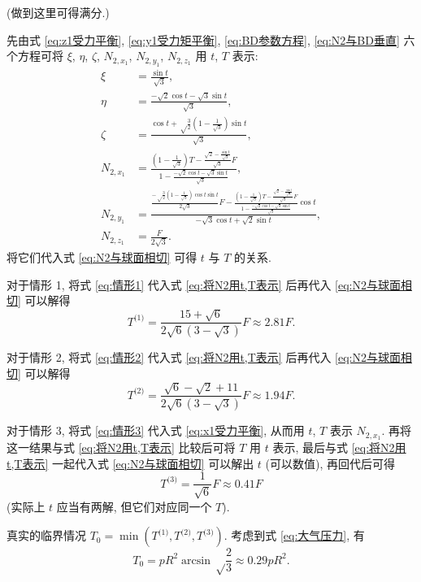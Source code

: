 \documentclass{article}
\begin{document}
(做到这里可得满分.)

先由式 \ref{eq:z1受力平衡}, \ref{eq:y1受力矩平衡}, \ref{eq:BD参数方程}, \ref{eq:N2与BD垂直}
六个方程可将 $\xi$, $\eta$, $\zeta$, $N_{2,x_1}$, $N_{2,y_1}$, $N_{2,z_1}$ 用 $t$, $T$ 表示:
\begin{equation}
\begin{split}
	\xi&=\frac{\sin t}{\sqrt3},\\
	\eta&=\frac{-\sqrt2\cos t-\sqrt3\sin t}{\sqrt3},\\
	\zeta&=\frac{\cos t+\sqrt\frac32\left(1-\frac1{\sqrt3}\right)\sin t}{\sqrt3},\\
	N_{2,x_1}&=\frac{\left(1-\frac1{\sqrt3}\right)T-\frac{\sqrt2-\frac{\sin t}{\sqrt3}}{\sqrt3}F}{1-\frac{-\sqrt2\cos t-\sqrt3\sin t}{\sqrt3}},\\
	N_{2,y_1}&=\frac{\frac{-\sqrt\frac32\left(1-\frac1{\sqrt3}\right)\cos t\sin t}{2\sqrt3}F-\frac{\left(1-\frac1{\sqrt3}\right)T-\frac{\sqrt2-\frac{\sin t}{\sqrt3}}{\sqrt3}F}{1-\frac{-\sqrt2\cos t-\sqrt3\sin t}{\sqrt3}}\cos t}{-\sqrt3\cos t+\sqrt2\sin t},\\
	N_{2,z_1}&=\frac F{2\sqrt3}.
\end{split}
	\label{eq:将N2用t,T表示}
\end{equation}
将它们代入式 \ref{eq:N2与球面相切} 可得 $t$ 与 $T$ 的关系.

对于情形 1, 将式 \ref{eq:情形1} 代入式 \ref{eq:将N2用t,T表示} 后再代入 \ref{eq:N2与球面相切} 可以解得
\begin{equation}
	T^{\text{(1)}}=\frac{15+\sqrt6}{2\sqrt6\left(3-\sqrt3\right)}F\approx2.81F.
\end{equation}

对于情形 2, 将式 \ref{eq:情形2} 代入式 \ref{eq:将N2用t,T表示} 后再代入 \ref{eq:N2与球面相切} 可以解得
\begin{equation}
	T^{\text{(2)}}=\frac{\sqrt6-\sqrt2+11}{2\sqrt6\left(3-\sqrt3\right)}F\approx1.94F.
\end{equation}

对于情形 3, 将式 \ref{eq:情形3} 代入式 \ref{eq:x1受力平衡}, 从而用 $t$, $T$ 表示 $N_{2,x_1}$.
再将这一结果与式 \ref{eq:将N2用t,T表示} 比较后可将 $T$ 用 $t$ 表示,
最后与式 \ref{eq:将N2用t,T表示} 一起代入式 \ref{eq:N2与球面相切} 可以解出 $t$ (可以数值),
再回代后可得
\begin{equation}
	T^{\text{(3)}}=\frac1{\sqrt6}F\approx0.41F
\end{equation}
(实际上 $t$ 应当有两解, 但它们对应同一个 $T$).

真实的临界情况 $T_0=\min\!\left(T^{\text{(1)}},T^{\text{(2)}},T^{\text{(3)}}\right)$.
考虑到式 \ref{eq:大气压力}, 有
\begin{equation}
	T_0=pR^2\arcsin\sqrt\frac23\approx0.29pR^2.
\end{equation}
\end{document}
